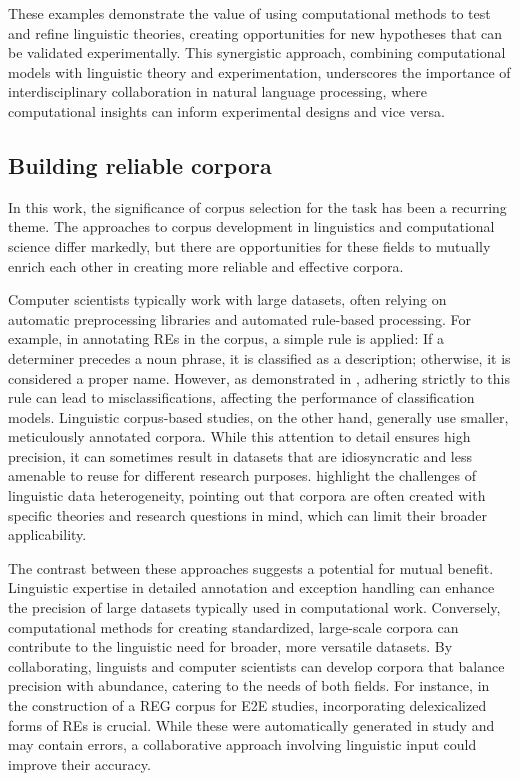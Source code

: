 These examples demonstrate the value of using computational methods to test and refine linguistic theories, creating opportunities for new hypotheses that can be validated experimentally. This synergistic approach, combining computational models with linguistic theory and experimentation, underscores the importance of interdisciplinary collaboration in natural language processing, where computational insights can inform experimental designs and vice versa.

\subsection{Building reliable corpora} 

In this work, the significance of corpus selection for the \context task has been a recurring theme. The approaches to corpus development in linguistics and computational science differ markedly, but there are opportunities for these fields to mutually enrich each other in creating more reliable and effective corpora.

Computer scientists typically work with large datasets, often relying on automatic preprocessing libraries and automated rule-based processing. For example, in annotating REs in the \webnlg corpus, a simple rule is applied: If a determiner precedes a noun phrase, it is classified as a description; otherwise, it is considered a proper name. However, as demonstrated in , adhering strictly to this rule can lead to misclassifications, affecting the performance of classification models. Linguistic corpus-based studies, on the other hand, generally use smaller, meticulously annotated corpora. While this attention to detail ensures high precision, it can sometimes result in datasets that are idiosyncratic and less amenable to reuse for different research purposes. \citet{schmidt2014avoiding} highlight the challenges of linguistic data heterogeneity, pointing out that corpora are often created with specific theories and research questions in mind, which can limit their broader applicability.

The contrast between these approaches suggests a potential for mutual benefit. Linguistic expertise in detailed annotation and exception handling can enhance the precision of large datasets typically used in computational work. Conversely, computational methods for creating standardized, large-scale corpora can contribute to the linguistic need for broader, more versatile datasets. By collaborating, linguists and computer scientists can develop corpora that balance precision with abundance, catering to the needs of both fields. For instance, in the construction of a REG corpus for E2E studies, incorporating delexicalized forms of REs is crucial. While these were automatically generated in study \studF and may contain errors, a collaborative approach involving linguistic input could improve their accuracy.

